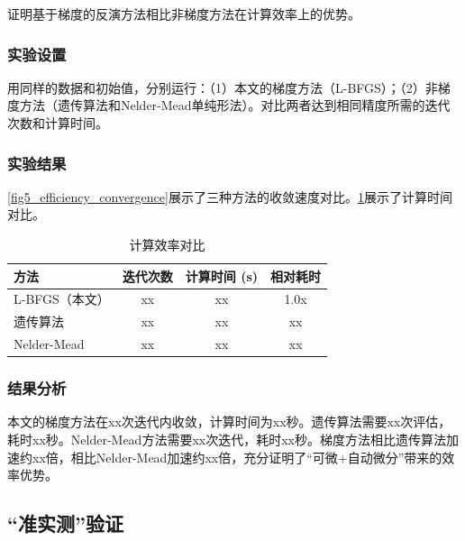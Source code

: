 \documentclass[withoutpreface,bwprint]{cumcmthesis}
\begin{document}
证明基于梯度的反演方法相比非梯度方法在计算效率上的优势。

\subsubsection{实验设置}

用同样的数据和初始值，分别运行：（1）本文的梯度方法（L-BFGS）；（2）非梯度方法（遗传算法和Nelder-Mead单纯形法）。对比两者达到相同精度所需的迭代次数和计算时间。

\subsubsection{实验结果}

\cref{fig5_efficiency_convergence}展示了三种方法的收敛速度对比。\cref{tab5_efficiency_time}展示了计算时间对比。


\begin{table}[!ht]
\centering
\caption{计算效率对比}
\label{tab5_efficiency_time}
\begin{tabular}{lccc}
\toprule
\textbf{方法} & \textbf{迭代次数} & \textbf{计算时间 (s)} & \textbf{相对耗时} \\
\midrule
L-BFGS（本文） & xx & xx & 1.0x \\
遗传算法 & xx & xx & xx \\
Nelder-Mead & xx & xx & xx \\
\bottomrule
\end{tabular}
\end{table}

\subsubsection{结果分析}

本文的梯度方法在xx次迭代内收敛，计算时间为xx秒。遗传算法需要xx次评估，耗时xx秒。Nelder-Mead方法需要xx次迭代，耗时xx秒。梯度方法相比遗传算法加速约xx倍，相比Nelder-Mead加速约xx倍，充分证明了“可微+自动微分”带来的效率优势。

\subsection{“准实测”验证}
\end{document}
